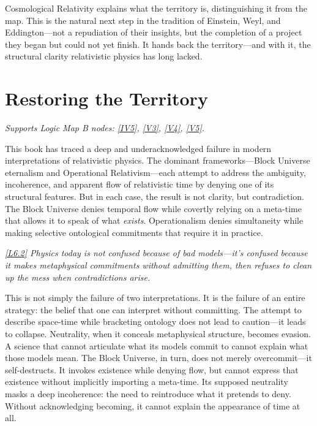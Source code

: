 \documentclass[12pt]{book}
\newcounter{logicanchor}
\newenvironment{logicanchorenv}[1]{\refstepcounter{logicanchor}\label{#1}}{}
\newcommand{\logiclink}[2]{\begin{logicanchorenv}{logic:#1}\end{logicanchorenv}\hyperref[appendix:#1]{[#1]}\xspace}
\begin{document}
Cosmological Relativity explains what the territory is, distinguishing it from the map. This is the natural next step in the tradition of Einstein, Weyl, and Eddington---not a repudiation of their insights, but the completion of a project they began but could not yet finish. It hands back the territory---and with it, the structural clarity relativistic physics has long lacked.

\chapter{Restoring the Territory}\label{sec:6}
\noindent\textit{Supports Logic Map B nodes: \hyperref[appendix:IV5]{[IV5]}, \hyperref[appendix:V3]{[V3]}, \hyperref[appendix:V4]{[V4]}, \hyperref[appendix:V5]{[V5]}.}

\vspace{4pt}

This book has traced a deep and underacknowledged failure in modern interpretations of relativistic physics. The dominant frameworks---Block Universe eternalism and Operational Relativism---each attempt to address the ambiguity, incoherence, and apparent flow of relativistic time by denying one of its structural features. But in each case, the result is not clarity, but contradiction. The Block Universe denies temporal flow while covertly relying on a meta-time that allows it to speak of what \textit{exists}. Operationalism denies simultaneity while making selective ontological commitments that require it in practice.

\textit{\logiclink{L6.2}{} Physics today is not confused because of bad models---it's confused because it makes metaphysical commitments without admitting them, then refuses to clean up the mess when contradictions arise.}

This is not simply the failure of two interpretations. It is the failure of an entire strategy: the belief that one can interpret without committing. The attempt to describe space-time while bracketing ontology does not lead to caution---it leads to collapse. Neutrality, when it conceals metaphysical structure, becomes evasion. A science that cannot articulate what its models commit to cannot explain what those models mean. The Block Universe, in turn, does not merely overcommit---it self-destructs. It invokes existence while denying flow, but cannot express that existence without implicitly importing a meta-time. Its supposed neutrality masks a deep incoherence: the need to reintroduce what it pretends to deny. Without acknowledging becoming, it cannot explain the appearance of time at all.
\end{document}
